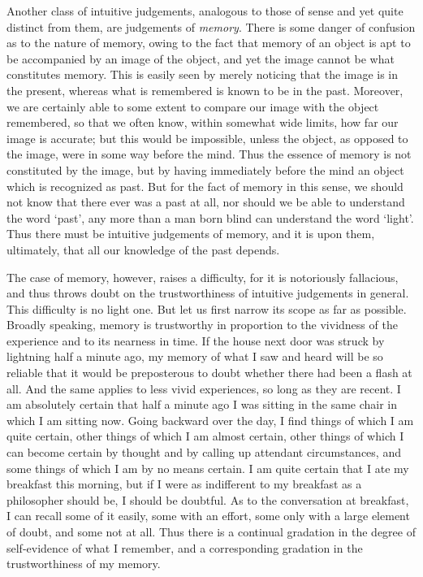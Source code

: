 \documentclass[oneside,letterpaper,12pt]{book}
\begin{document}
Another class of intuitive judgements, analogous to those of sense and
yet quite distinct from them, are judgements of \emph{memory}. There is
some danger of confusion as to the nature of memory, owing to the fact
that memory of an object is apt to be accompanied by an image of the
object, and yet the image cannot be what constitutes memory. This is
easily seen by merely noticing that the image is in the present, whereas
what is remembered is known to be in the past. Moreover, we are
certainly able to some extent to compare our image with the object
remembered, so that we often know, within somewhat wide limits, how far
our image is accurate; but this would be impossible, unless the object,
as opposed to the image, were in some way before the mind. Thus the
essence of memory is not constituted by the image, but by having
immediately before the mind an object which is recognized as past. But
for the fact of memory in this sense, we should not know that there ever
was a past at all, nor should we be able to understand the word
`past', any more than a man born blind
can understand the word `light'. Thus
there must be intuitive judgements of memory, and it is upon them,
ultimately, that all our knowledge of the past depends.

The case of memory, however, raises a difficulty, for it is notoriously
fallacious, and thus throws doubt on the trustworthiness of intuitive
judgements in general. This difficulty is no light one. But let us first
narrow its scope as far as possible. Broadly speaking, memory is
trustworthy in proportion to the vividness of the experience and to its
nearness in time. If the house next door was struck by lightning half a
minute ago, my memory of what I saw and heard will be so reliable that
it would be preposterous to doubt whether there had been a flash at all.
And the same applies to less vivid experiences, so long as they are
recent. I am absolutely certain that half a minute ago I was sitting in
the same chair in which I am sitting now. Going backward over the day, I
find things of which I am quite certain, other things of which I am
almost certain, other things of which I can become certain by thought
and by calling up attendant circumstances, and some things of which I am
by no means certain. I am quite certain that I ate my breakfast this
morning, but if I were as indifferent to my breakfast as a philosopher
should be, I should be doubtful. As to the conversation at breakfast, I
can recall some of it easily, some with an effort, some only with a
large element of doubt, and some not at all. Thus there is a continual
gradation in the degree of self-evidence of what I remember, and a
corresponding gradation in the trustworthiness of my memory. \label{uncertain}
\end{document}
